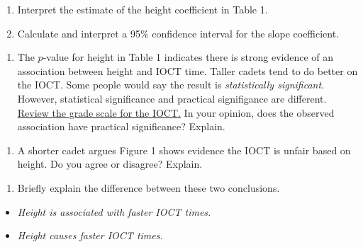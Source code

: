 \documentclass[]{book}
\providecommand{\tightlist}{%
  \setlength{\itemsep}{0pt}\setlength{\parskip}{0pt}}
\begin{document}
\begin{enumerate}
\def\labelenumi{\arabic{enumi}.}
\setcounter{enumi}{4}
\item
  Interpret the estimate of the height coefficient in Table 1.

  \vspace{1in}
\item
  Calculate and interpret a 95\% confidence interval for the slope coefficient.
\end{enumerate}

\vspace{1in}

\newpage

\begin{enumerate}
\def\labelenumi{\arabic{enumi}.}
\setcounter{enumi}{6}
\tightlist
\item
  The \(p\)-value for height in Table 1 indicates there is strong evidence of an association between height and IOCT time. Taller cadets tend to do better on the IOCT. Some people would say the result is \emph{statistically significant}. However, statistical significance and practical signifigance are different. \href{https://en.wikipedia.org/wiki/Indoor_Obstacle_Course_Test}{Review the grade scale for the IOCT.} In your opinion, does the observed association have practical significance? Explain.
\end{enumerate}

\vspace{1in}

\begin{enumerate}
\def\labelenumi{\arabic{enumi}.}
\setcounter{enumi}{7}
\tightlist
\item
  A shorter cadet argues Figure 1 shows evidence the IOCT is unfair based on height. Do you agree or disagree? Explain.
\end{enumerate}

\vspace{1in}

\begin{enumerate}
\def\labelenumi{\arabic{enumi}.}
\setcounter{enumi}{8}
\tightlist
\item
  Briefly explain the difference between these two conclusions.
\end{enumerate}

\begin{itemize}
\item
  \emph{Height is associated with faster IOCT times.}
\item
  \emph{Height causes faster IOCT times.}
\end{itemize}
\end{document}
